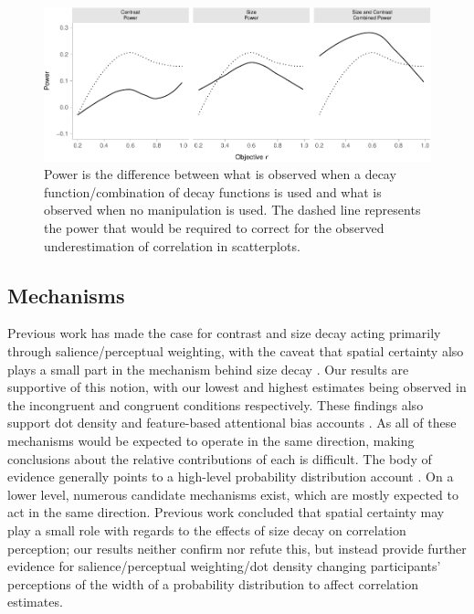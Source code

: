 \documentclass[manuscript, review, anonymous, screen]{acmart}
\begin{document}
\begin{figure}

{\centering \includegraphics[width=1\textwidth,height=\textheight]{size_and_contrast_files/figure-pdf/fig-power-plot-1.pdf}

}

\caption{\label{fig-power-plot}Power is the difference between what is
observed when a decay function/combination of decay functions is used
and what is observed when no manipulation is used. The dashed line
represents the power that would be required to correct for the observed
underestimation of correlation in scatterplots.}

\end{figure}

\hypertarget{sec-mechs}{%
\subsection{Mechanisms}\label{sec-mechs}}

Previous work has made the case for contrast and size decay acting
primarily through salience/perceptual weighting, with the caveat that
spatial certainty also plays a small part in the mechanism behind size
decay \citep{strain_2023, strain_2023b}. Our results are supportive of
this notion, with our lowest and highest estimates being observed in the
incongruent and congruent conditions respectively. These findings also
support dot density \citep{yang_2023} and feature-based attentional bias
accounts \citep{hong_2021, sun_2016}. As all of these mechanisms would
be expected to operate in the same direction, making conclusions about
the relative contributions of each is difficult. The body of evidence
generally points to a high-level probability distribution account
\citep{rensink_2017, rensink_2022}. On a lower level, numerous candidate
mechanisms exist, which are mostly expected to act in the same
direction. Previous work concluded that spatial certainty
\citep{strain_2023b} may play a small role with regards to the effects
of size decay on correlation perception; our results neither confirm nor
refute this, but instead provide further evidence for
salience/perceptual weighting/dot density changing participants'
perceptions of the width of a probability distribution to affect
correlation estimates.
\end{document}
